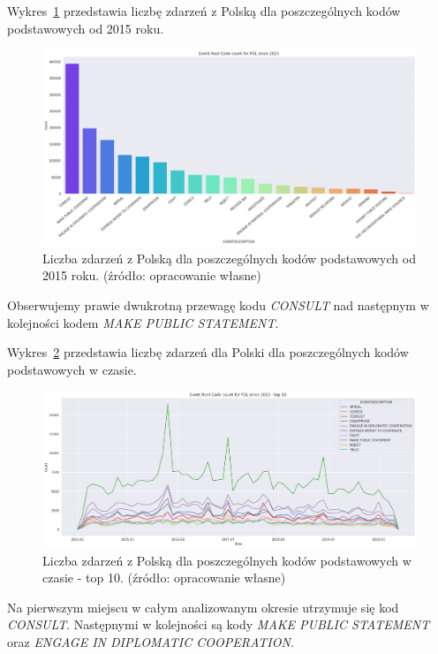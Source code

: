 \documentclass[11pt]{report}
\begin{document}
    Wykres~\ref{fig:PLPERC} przedstawia liczbę zdarzeń z Polską dla poszczególnych kodów podstawowych od 2015 roku.
    \begin{figure}[!htp]
        \centering
        \includegraphics[width=\linewidth]{fig/PL/PLERC.png}
        \caption{Liczba zdarzeń z Polską dla poszczególnych kodów podstawowych od 2015 roku. (źródło: opracowanie własne)}
        \label{fig:PLPERC}
    \end{figure}
    Obserwujemy prawie dwukrotną przewagę kodu \textit{CONSULT} nad następnym w kolejności kodem \textit{MAKE PUBLIC STATEMENT}.

    Wykres~\ref{fig:PLPERCinTIME} przedstawia liczbę zdarzeń dla Polski dla poszczególnych kodów podstawowych w czasie.
    \begin{figure}[!htp]
        \centering
        \includegraphics[width=\linewidth]{fig/PL/PLERCinTIME.png}
        \caption{Liczba zdarzeń z Polską dla poszczególnych kodów podstawowych w czasie - top 10. (źródło: opracowanie własne)}
        \label{fig:PLPERCinTIME}
    \end{figure}
    Na pierwszym miejscu w całym analizowanym okresie utrzymuje się kod \textit{CONSULT}.
    Następnymi w kolejności są kody \textit{MAKE PUBLIC STATEMENT} oraz \textit{ENGAGE IN DIPLOMATIC COOPERATION}.
\end{document}
